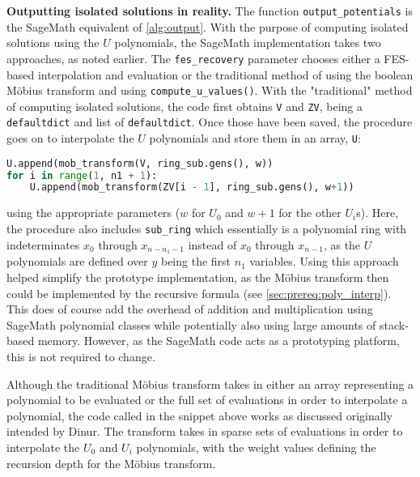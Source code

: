 \textbf{Outputting isolated solutions in reality.} The function \texttt{output\_potentials} is the SageMath equivalent of \cref{alg:output}. With the purpose of computing isolated solutions using the $U$ polynomials, the SageMath implementation takes two approaches, as noted earlier. The \texttt{fes\_recovery} parameter chooses either a FES-based interpolation and evaluation or the traditional method of using the boolean Möbius transform and using \texttt{compute\_u\_values()}. With the "traditional" method of computing isolated solutions, the code first obtains \texttt{V} and \texttt{ZV}, being a \texttt{defaultdict} and list of \texttt{defaultdict}. Once those have been saved, the procedure goes on to interpolate the $U$ polynomials and store them in an array, \texttt{U}:
\begin{lstlisting}[language=Python,style=mystyle]
U.append(mob_transform(V, ring_sub.gens(), w))
for i in range(1, n1 + 1):
    U.append(mob_transform(ZV[i - 1], ring_sub.gens(), w+1))
\end{lstlisting}
using the appropriate parameters ($w$ for $U_0$ and $w + 1$ for the other $U_i$s). Here, the procedure also includes \texttt{sub\_ring} which essentially is a polynomial ring with indeterminates $x_0$ through $x_{n - n_1 - 1}$ instead of $x_0$ through $x_{n - 1}$, as the $U$ polynomials are defined over $y$ being the first $n_1$ variables. Using this approach helped simplify the prototype implementation, as the Möbius transform then could be implemented by the recursive formula (see \cref{sec:prereq:poly_interp}). This does of course add the overhead of addition and multiplication using SageMath polynomial classes while potentially also using large amounts of stack-based memory. However, as the SageMath code acts as a prototyping platform, this is not required to change.

Although the traditional Möbius transform takes in either an array representing a polynomial to be evaluated or the full set of evaluations in order to interpolate a polynomial, the code called in the snippet above works as discussed originally intended by Dinur. The transform takes in sparse sets of evaluations in order to interpolate the $U_0$ and $U_i$ polynomials, with the weight values defining the recursion depth for the Möbius transform. 

